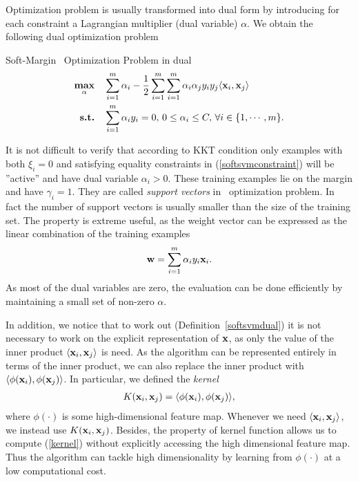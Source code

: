 {%
Optimization problem is usually transformed into dual form by introducing for each constraint a Lagrangian multiplier (dual variable) $\alpha$.
We obtain the following dual optimization problem
\begin{definition}{Soft-Margin \svm\ Optimization Problem in dual}\label{softsvmdual}
	\begin{align*}
		\underset{\mathbf {\alpha}}{\textbf{max}} & \quad\sum_{i=1}^{m}\alpha_i -\frac{1}{2}\sum_{i=1}^{m}\sum_{i=1}^{m}\alpha_i\alpha_jy_iy_j\langle \mathbf {x}_i, \mathbf {x}_j \rangle\\
		\textbf{s.t.} & \quad \sum_{i=1}^{m}\alpha_iy_i=0, \, 0\le\alpha_i\le C, \, \forall i\in\{1,\cdots,m\}.
	\end{align*}
\end{definition}
It is not difficult to verify that according to KKT condition only examples with both $\xi_i=0$ and satisfying equality constraints in (\ref{softsvmconstraint}) will be ''active'' and have dual variable $\alpha_i>0$.
These training examples lie on the margin and have $\gamma_i=1$.
They are called \textit{support vectors} in \svm\ optimization problem.
In fact the number of support vectors is usually smaller than the size of the training set.
The property is extreme useful, as the weight vector can be expressed as the linear combination of the training examples
\begin{align*}
	\mathbf {w} = \sum_{i=1}^{m}\alpha_iy_i\mathbf {x}_i.
\end{align*}
As most of the dual variables are zero, the evaluation can be done efficiently by maintaining a small set of non-zero $\alpha$.

In addition, we notice that to work out (Definition~\ref{softsvmdual}) it is not necessary to work on the explicit representation of $\mathbf {x}$, as only the value of the inner product $\langle \mathbf {x}_i, \mathbf {x}_j \rangle$ is need.
As the algorithm can be represented entirely in terms of the inner product, we can also replace the inner product with $\langle \phi(\mathbf {x}_i), \phi(\mathbf {x}_j) \rangle$.
In particular, we defined the \textit{kernel}
\begin{align}
	K(\mathbf {x}_i,\mathbf {x}_j) = \langle \phi(\mathbf {x}_i), \phi(\mathbf {x}_j) \rangle, \label{kernel}
\end{align}
where $\phi(\cdot)$ is some high-dimensional feature map.
Whenever we need $\langle \mathbf {x}_i, \mathbf {x}_j \rangle$, we instead use $K(\mathbf {x}_i,\mathbf {x}_j)$.
Besides, the property of kernel function \citep{Scholkopf02learning} allows us to compute (\ref{kernel}) without explicitly accessing the high dimensional feature map.
Thus the algorithm can tackle high dimensionality by learning from $\phi(\cdot)$ at a low computational cost.

}
